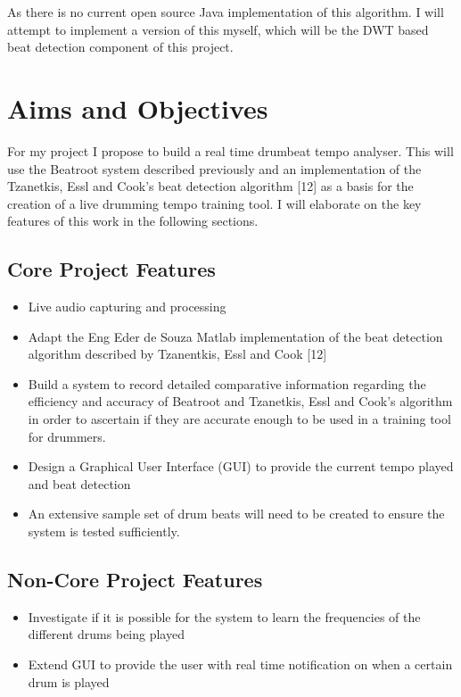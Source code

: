 \documentclass[a4paper, 11pt]{article}
\begin{document}
As there is no current open source Java implementation of this algorithm. I will attempt to implement a version of this myself, which will be the DWT based beat detection component of this project.


\maketitle{}
\section{Aims and Objectives}
For my project I propose to build a real time drumbeat tempo analyser. This will use the Beatroot system described previously and an implementation of the Tzanetkis, Essl and Cook's beat detection algorithm [12] as a basis for the creation of a live drumming tempo training tool. I will elaborate on the key features of this work in the following sections.


\subsection{Core Project Features}
\begin{itemize}
\item Live audio capturing and processing
\item Adapt the Eng Eder de Souza Matlab implementation of the beat detection algorithm described by Tzanentkis, Essl and Cook [12] 
\item Build a system to record detailed comparative information regarding the efficiency and accuracy of Beatroot and Tzanetkis, Essl and Cook's algorithm in order to ascertain if they are accurate enough to be used in a training tool for drummers.
\item Design a Graphical User Interface (GUI) to provide the current tempo played and beat detection
\item An extensive sample set of drum beats will need to be created to ensure the system is tested sufficiently.
\end{itemize}

\subsection{Non-Core Project Features}
\begin{itemize}
\item Investigate if it is possible for the system to learn the frequencies of the different drums being played
\item Extend GUI to provide the user with real time notification on when a certain drum is played
\end{itemize}
\end{document}
